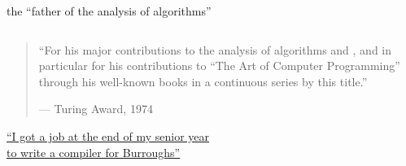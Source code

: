 
\begin{frame}{}
\end{frame}

\begin{frame}{}
  \begin{center}
    {the ``father of the analysis of algorithms''}
  \end{center}

  \begin{columns}
      \begin{center}
      \end{center}
  \end{columns}

  \pause
  \vspace{0.30cm}
  \begin{quote}
    \centering
    ``For his major contributions to the analysis of algorithms
      and ,
      and in particular for his contributions to ``The Art of Computer Programming''
      through his well-known books in a continuous series by this title.''

    \hfill --- Turing Award, 1974
  \end{quote}
\end{frame}

\begin{frame}{}

  \begin{center}
  \end{center}
\end{frame}

\begin{frame}{}
  \begin{center}

    \vspace{0.50cm}
    \href{https://youtu.be/QeiuVNDQg4k}{``I got a job at the end of my senior year 
    \\ to write a compiler for Burroughs''}
  \end{center}
\end{frame}

